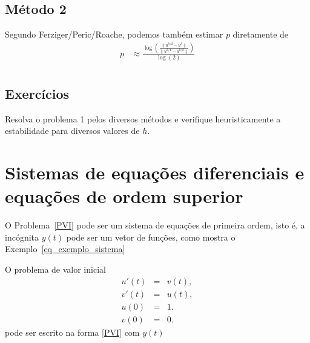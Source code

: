 \subsection{Método 2}
Segundo Ferziger/Peric/Roache, podemos também estimar $p$ diretamente de
\begin{eqnarray}
  p  & \approx  \frac{ \log \left(   \frac{\|u^{h/2}-u^{h}\|}{\|u^{h/4}-u^{h/2}\|} \right)  }{\log(2)} \\
\end{eqnarray}













\subsection*{Exercícios}

\begin{exer} Resolva o problema 1 pelos diversos métodos e verifique heuristicamente a estabilidade para diversos valores de $h$.
\end{exer}











\section{Sistemas de equações diferenciais e equações de ordem superior}
O Problema~\eqref{PVI} pode ser um sistema de equações de primeira ordem, isto é, a incógnita $y(t)$ pode ser um vetor de funções, como mostra o Exemplo~\ref{eq_exemplo_sistema}
\begin{ex}\label{exemplo_sistema_PVI}O problema de valor inicial
\begin{subequations}\label{eq_exemplo_sistema}
\begin{eqnarray}
u'(t)&=&v(t),\\
v'(t)&=&u(t),\\
u(0)&=&1.\\
v(0)&=&0.
\end{eqnarray}
\end{subequations}
pode ser escrito na forma \eqref{PVI} com $y(t)$
\end{ex}

